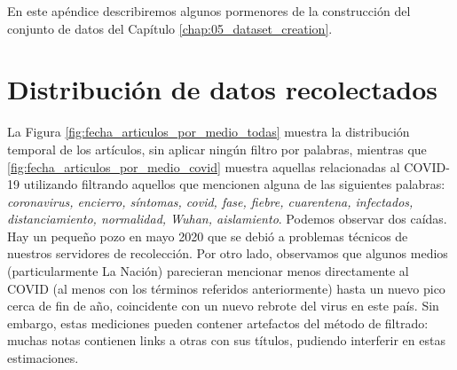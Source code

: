 En este apéndice describiremos algunos pormenores de la construcción del conjunto de datos del Capítulo \ref{chap:05_dataset_creation}.


\section{Distribución de datos recolectados}
\label{app:distribucion_datos}
La Figura \ref{fig:fecha_articulos_por_medio_todas} muestra la distribución temporal de los artículos, sin aplicar ningún filtro por palabras, mientras que \ref{fig:fecha_articulos_por_medio_covid} muestra aquellas relacionadas al COVID-19 utilizando filtrando aquellos que mencionen alguna de las siguientes palabras: \emph{coronavirus, encierro, síntomas, covid, fase, fiebre, cuarentena, infectados, distanciamiento, normalidad,  Wuhan, aislamiento}. Podemos observar dos caídas. Hay un pequeño pozo en mayo 2020 que se debió a problemas técnicos de nuestros servidores de recolección. Por otro lado, observamos que algunos medios (particularmente La Nación) parecieran mencionar menos directamente al COVID (al menos con los términos referidos anteriormente) hasta un nuevo pico cerca de fin de año, coincidente con un nuevo rebrote del virus en este país. Sin embargo, estas mediciones pueden contener artefactos del método de filtrado: muchas notas contienen links a otras con sus títulos, pudiendo interferir en estas estimaciones.


